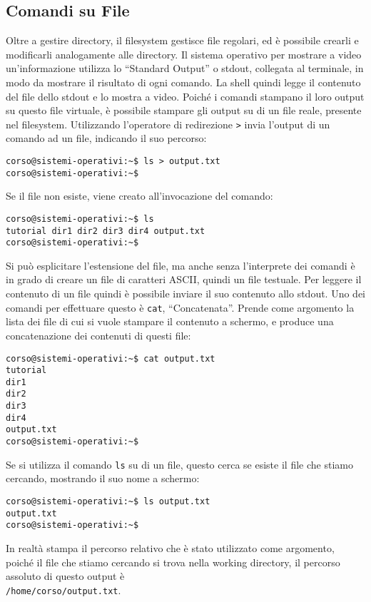 \documentclass{article}
\numberwithin{equation}{subsection}
\begin{document}
\subsection{Comandi su File}

Oltre a gestire directory, il filesystem gestisce file regolari, ed è possibile crearli e modificarli analogamente alle directory. Il sistema operativo per mostrare a video un'informazione utilizza lo ``Standard Output'' o stdout, collegata al terminale, in modo da mostrare il risultato di ogni comando. La shell quindi legge il contenuto 
del file dello stdout e lo mostra a video. Poiché i comandi stampano il loro output su questo file virtuale, è possibile stampare gli output su di un file reale, presente nel filesystem. 
Utilizzando l'operatore di redirezione \verb|>| invia l'output di un comando ad un file, indicando il suo percorso:
\begin{verbatim}
corso@sistemi-operativi:~$ ls > output.txt
corso@sistemi-operativi:~$
\end{verbatim}
Se il file non esiste, viene creato all'invocazione del comando:
\begin{verbatim}
corso@sistemi-operativi:~$ ls
tutorial dir1 dir2 dir3 dir4 output.txt
corso@sistemi-operativi:~$
\end{verbatim}
Si può esplicitare l'estensione del file, ma anche senza l'interprete dei comandi è in grado di creare un file di caratteri ASCII, quindi un file testuale. Per leggere il contenuto di un file quindi è possibile 
inviare il suo contenuto allo stdout. Uno dei comandi per effettuare questo è \verb|cat|, ``Concatenata''. Prende come argomento la lista dei file di cui si vuole stampare il contenuto a schermo, e produce 
una concatenazione dei contenuti di questi file:
\begin{verbatim}
corso@sistemi-operativi:~$ cat output.txt
tutorial 
dir1 
dir2
dir3
dir4
output.txt
corso@sistemi-operativi:~$
\end{verbatim}
Se si utilizza il comando \verb|ls| su di un file, questo cerca se esiste il file che stiamo cercando, mostrando il suo nome a schermo:
\begin{verbatim}
corso@sistemi-operativi:~$ ls output.txt
output.txt
corso@sistemi-operativi:~$
\end{verbatim}
In realtà stampa il percorso relativo che è stato utilizzato come argomento, poiché il file che stiamo cercando si trova nella working directory, il percorso assoluto di questo output è\\
\verb|/home/corso/output.txt|. 
\end{document}
